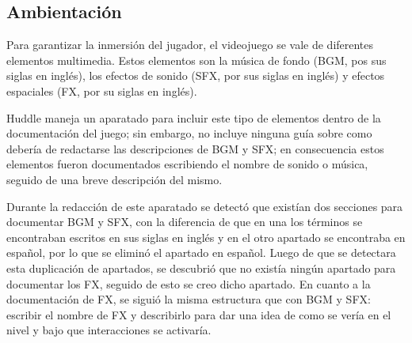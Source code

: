 \subsection{Ambientación}
	Para garantizar la inmersión del jugador, el videojuego se vale de diferentes
	 elementos multimedia. Estos elementos son la música de fondo (BGM, pos sus 
	 siglas en inglés), los efectos de sonido (SFX, por sus siglas en inglés) y  
	 efectos espaciales (FX, por su siglas en inglés).
\\
\par	
	Huddle maneja un aparatado para incluir este tipo de elementos dentro de la 
	documentación del juego; sin embargo, no incluye ninguna guía sobre como debería 
	de redactarse las descripciones de BGM y SFX; en consecuencia estos elementos 
	fueron documentados escribiendo el nombre de sonido o música, seguido de una 
	breve descripción del mismo.   
\\
\par
Durante la redacción de este aparatado se detectó que existían dos secciones para 
documentar BGM y SFX, con la diferencia de que en una los términos se encontraban 
escritos en sus siglas en inglés y en el otro apartado se encontraba en español, 
por lo que se eliminó el apartado en español. Luego de que se detectara esta 
duplicación de apartados, se descubrió que no existía ningún apartado para documentar 
los FX, seguido de esto se creo dicho apartado. En cuanto a la documentación de FX, 
se siguió la misma estructura que con BGM y SFX: escribir el nombre de FX y 
describirlo para dar una idea de como se vería en el nivel y bajo que interacciones 
se activaría. 